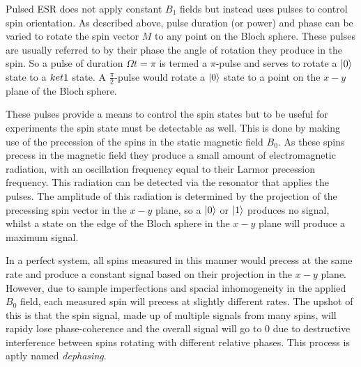Pulsed ESR does not apply constant $B_1$ fields but instead uses pulses to control spin orientation. As described above, pulse duration (or power) and phase can be varied to rotate the spin vector $M$ to any point on the Bloch sphere. These pulses are usually referred to by their phase the angle of rotation they produce in the spin. So a pulse of duration $\Omega t = \pi$ is termed a $\pi$-pulse and serves to rotate a $\ket{0}$ state to a $\\ket{1}$ state. A $\frac{\pi}{2}$-pulse would rotate a $\ket{0}$ state to a point on the $x-y$ plane of the Bloch sphere.

These pulses provide a means to control the spin states but to be useful for experiments the spin state must be detectable as well. This is done by making use of the precession of the spins in the static magnetic field $B_0$. As these spins precess in the magnetic field they produce a small amount of electromagnetic radiation, with an oscillation frequency equal to their Larmor precession frequency. This radiation can be detected via the resonator that applies the pulses. The amplitude of this radiation is determined by the projection of the precessing spin vector in the $x-y$ plane, so a $\ket{0}$ or $\ket{1}$ produces no signal, whilst a state on the edge of the Bloch sphere in the $x-y$ plane will produce a maximum signal.

In a perfect system, all spins measured in this manner would precess at the same rate and produce a constant signal based on their projection in the $x-y$ plane. However, due to sample imperfections and spacial inhomogeneity in the applied $B_0$ field, each measured spin will precess at slightly different rates. The upshot of this is that the spin signal, made up of multiple signals from many spins, will rapidy lose phase-coherence and the overall signal will go to 0 due to destructive interference between spins rotating with different relative phases. This process is aptly named \emph{dephasing}.

